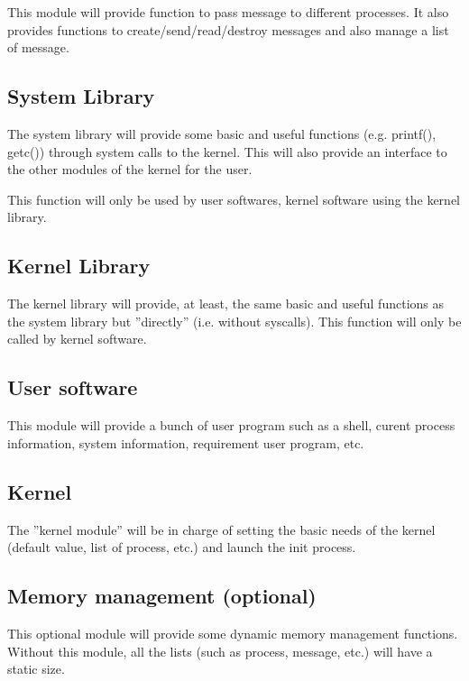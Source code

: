 This module will provide function to pass message to different processes. It also provides functions to create/send/read/destroy messages and also manage a list of message.

\subsection{System Library}

The system library will provide some basic and useful functions (e.g. printf(), getc()) through system calls to the kernel. This will also provide an interface to the other modules of the kernel for the user.

This function will only be used by user softwares, kernel software using the kernel library.

\subsection{Kernel Library}

The kernel library will provide, at least, the same basic and useful functions as the system library but ''directly'' (i.e. without syscalls). This function will only be called by kernel software.

\subsection{User software}

This module will provide a bunch of user program such as a shell, curent process information, system information, requirement user program, etc.

\subsection{Kernel}

The ''kernel module'' will be in charge of setting the basic needs of the kernel (default value, list of process, etc.) and launch the init process.

\subsection{Memory management (optional)}

This optional module will provide some dynamic memory management functions. Without this module, all the lists (such as process, message, etc.) will have a static size.

